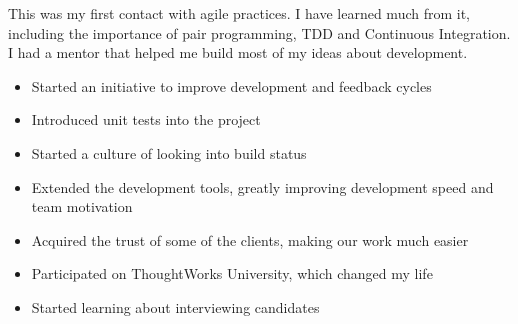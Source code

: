 \documentclass[10pt,a4paper,ragged2e,withhyper]{altacv}
\begin{document}
\begin{paracol}{2}
{This was my first contact with agile practices. I have learned much from it, including the importance of pair programming, TDD and Continuous Integration. I had a mentor that helped me build most of my ideas about development.

\begin{itemize}
\item Started an initiative to improve development and feedback cycles
\item Introduced unit tests into the project
\item Started a culture of looking into build status
\item Extended the development tools, greatly improving development speed and team motivation
\item Acquired the trust of some of the clients, making our work much easier
\item Participated on ThoughtWorks University, which changed my life
\item Started learning about interviewing candidates
\end{itemize}
}










\switchcolumn


\end{paracol}
\end{document}
